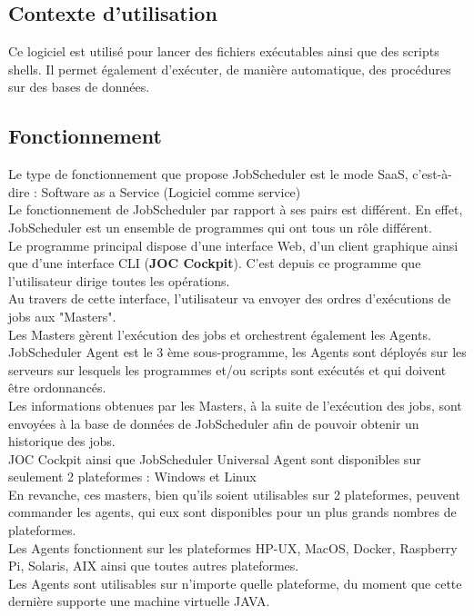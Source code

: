 \documentclass[12pt]{article}
\begin{document}
\subsection{Contexte d'utilisation}
Ce logiciel est utilisé pour lancer des fichiers exécutables ainsi que des scripts shells. Il permet également d'exécuter, de manière automatique, des procédures sur des bases de données. 

\subsection{Fonctionnement}
Le type de fonctionnement que propose JobScheduler est le mode SaaS, c'est-à-dire : Software as a Service (Logiciel comme service)
\\
Le fonctionnement de JobScheduler par rapport à ses pairs est différent. En effet, JobScheduler est un ensemble de programmes qui ont tous un rôle différent.
\\
Le programme principal dispose d'une interface Web, d'un client graphique ainsi que d'une interface CLI (\textbf{JOC Cockpit}). C'est depuis ce programme que l'utilisateur dirige toutes les opérations.
\\
Au travers de cette interface, l'utilisateur va envoyer des ordres d'exécutions de jobs aux "Masters".
\\
Les Masters gèrent l'exécution des jobs et orchestrent également les Agents.
\\
JobScheduler Agent est le 3 ème sous-programme, les Agents sont déployés sur les serveurs sur lesquels les programmes et/ou scripts sont exécutés et qui doivent être ordonnancés.
\\
Les informations obtenues par les Masters, à la suite de l'exécution des jobs, sont envoyées à la base de données de JobScheduler afin de pouvoir obtenir un historique des jobs.
\\
JOC Cockpit ainsi que JobScheduler Universal Agent sont disponibles sur seulement 2 plateformes : Windows et Linux
\\
En revanche, ces masters, bien qu'ils soient utilisables sur 2 plateformes, peuvent commander les agents, qui eux sont disponibles pour un plus grands nombres de plateformes.
\\
Les Agents fonctionnent sur les plateformes HP-UX, MacOS, Docker, Raspberry Pi, Solaris, AIX ainsi que toutes autres plateformes.
\\
Les Agents sont utilisables sur n'importe quelle plateforme, du moment que cette dernière supporte une machine virtuelle JAVA.
\end{document}
